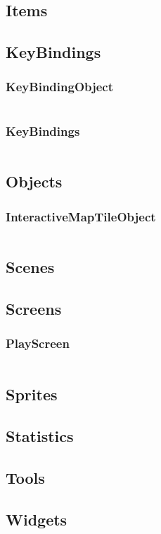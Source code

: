 \documentclass[12p]{article}
\begin{document}
\subsection{Items}

\subsection{KeyBindings}
\subsubsection{KeyBindingObject} \label{KeyBindingObject.java}
\inputminted[linenos,breaklines]{java}{code/KeyBindings/KeyBindingObject.java}
\subsubsection{KeyBindings} \label{KeyBindings.java}
\inputminted[linenos,breaklines]{java}{code/KeyBindings/KeyBindings.java}

\subsection{Objects}
\subsubsection{InteractiveMapTileObject} \label{InteractiveMapTileObject.java}
\inputminted[linenos,breaklines]{java}{code/Objects/InteractiveMapTileObject.java}

\subsection{Scenes}

\subsection{Screens}
\subsubsection{PlayScreen} \label{PlayScreen.java}
\inputminted[linenos,breaklines]{java}{code/Screens/PlayScreen.java}

\subsection{Sprites}

\subsection{Statistics}

\subsection{Tools}

\subsection{Widgets}

\end{document}
